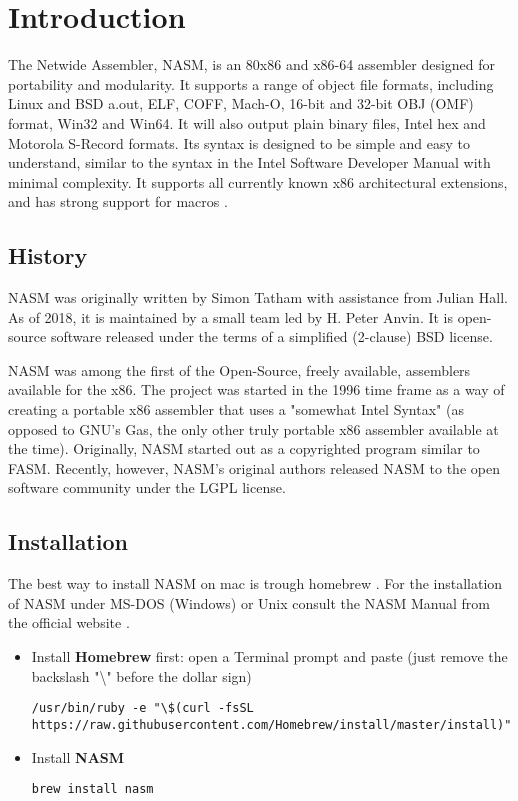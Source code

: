 \chapter[Introduction]{Introduction}
The Netwide Assembler, NASM, is an 80x86 and x86-64 assembler designed for portability and modularity. It supports a range of object file formats, including Linux and BSD a.out, ELF, COFF, Mach-O, 16-bit and 32-bit OBJ (OMF) format, Win32 and Win64. It will also output plain binary files, Intel hex and Motorola S-Record formats. Its syntax is designed to be simple and easy to understand, similar to the syntax in the Intel Software Developer Manual with minimal complexity. It supports all currently known x86 architectural extensions, and has strong support for macros \cite{website:NASM}.

\section{History}
NASM was originally written by Simon Tatham with assistance from Julian Hall. As of 2018, it is maintained by a small team led by H. Peter Anvin. It is open-source software released under the terms of a simplified (2-clause) BSD license.

NASM was among the first of the Open-Source, freely available, assemblers available for the x86. The project was started in the 1996 time
frame as a way of creating a portable x86 assembler that uses a "somewhat Intel Syntax" (as opposed to GNU's Gas, the only other truly portable x86 assembler available at the time). Originally, NASM started out as a copyrighted program similar to FASM. Recently, however, NASM's original authors released NASM to the open software community under the LGPL license.

\section{Installation}
\noindent The best way to install NASM on mac is trough homebrew \cite{website:Homebrew}. For the installation of NASM under MS-DOS (Windows) or Unix consult the NASM Manual from the official website \cite{website:NASM}. 

\begin{itemize}
\item Install \textbf{Homebrew} first: open a Terminal prompt and paste (just remove the backslash "\textbackslash" before the dollar sign)
	\begin{verbatim}
/usr/bin/ruby -e "\$(curl -fsSL https://raw.githubusercontent.com/Homebrew/install/master/install)"
	\end{verbatim}

\item Install \textbf{NASM}
	\begin{verbatim}
brew install nasm
	\end{verbatim}
\end{itemize}

